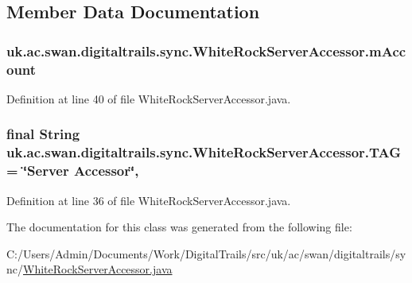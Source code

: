 \subsection{Member Data Documentation}
\hypertarget{classuk_1_1ac_1_1swan_1_1digitaltrails_1_1sync_1_1_white_rock_server_accessor_ae964c27059bf80e204342e1c528fbec0}{
\subsubsection[{m\+Account}]{ uk.\+ac.\+swan.\+digitaltrails.\+sync.\+White\+Rock\+Server\+Accessor.\+m\+Account\hspace{0.3cm}{\ttfamily [private]}}}\label{classuk_1_1ac_1_1swan_1_1digitaltrails_1_1sync_1_1_white_rock_server_accessor_ae964c27059bf80e204342e1c528fbec0}


Definition at line 40 of file White\+Rock\+Server\+Accessor.\+java.

\hypertarget{classuk_1_1ac_1_1swan_1_1digitaltrails_1_1sync_1_1_white_rock_server_accessor_a76a170f7051ecf2953fdd8951f893dab}{
\subsubsection[{T\+A\+G}]{\setlength{\rightskip}{0pt plus 5cm}final String uk.\+ac.\+swan.\+digitaltrails.\+sync.\+White\+Rock\+Server\+Accessor.\+T\+A\+G = \char`\"{}Server Accessor\char`\"{}\hspace{0.3cm}{\ttfamily [static]}, {\ttfamily [private]}}}\label{classuk_1_1ac_1_1swan_1_1digitaltrails_1_1sync_1_1_white_rock_server_accessor_a76a170f7051ecf2953fdd8951f893dab}


Definition at line 36 of file White\+Rock\+Server\+Accessor.\+java.



The documentation for this class was generated from the following file\+:\begin{DoxyCompactItemize}
\item 
C\+:/\+Users/\+Admin/\+Documents/\+Work/\+Digital\+Trails/src/uk/ac/swan/digitaltrails/sync/\hyperlink{_white_rock_server_accessor_8java}{White\+Rock\+Server\+Accessor.\+java}\end{DoxyCompactItemize}
